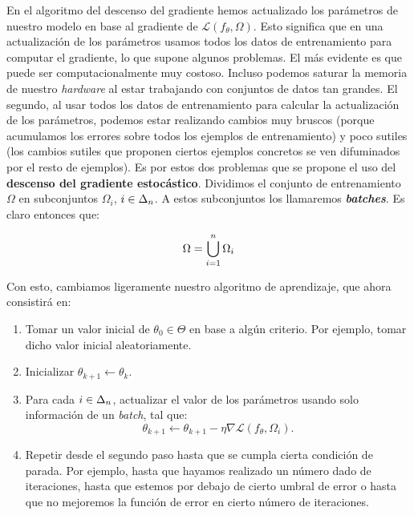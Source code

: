 En el algoritmo del descenso del gradiente hemos actualizado los parámetros de nuestro modelo en base al gradiente de $\mathcal{L}(f_{\theta}, \Omega)$. Esto significa que en una actualización de los parámetros usamos todos los datos de entrenamiento para computar el gradiente, lo que supone algunos problemas. El más evidente es que puede ser computacionalmente muy costoso. Incluso podemos saturar la memoria de nuestro \textit{hardware} al estar trabajando con conjuntos de datos tan grandes. El segundo, al usar todos los datos de entrenamiento para calcular la actualización de los parámetros, podemos estar realizando cambios muy bruscos (porque acumulamos los errores sobre todos los ejemplos de entrenamiento) y poco sutiles (los cambios sutiles que proponen ciertos ejemplos concretos se ven difuminados por el resto de ejemplos). Es por estos dos problemas que se propone el uso del \textbf{descenso del gradiente estocástico}. Dividimos el conjunto de entrenamiento $\Omega$ en subconjuntos $\Omega_i$, $i \in \Delta_{n}$. A estos subconjuntos los llamaremos \textbf{\textit{batches}}. Es claro entonces que:

\begin{equation}
	\Omega = \bigcup_{i = 1}^n \Omega_i
\end{equation}

Con esto, cambiamos ligeramente nuestro algoritmo de aprendizaje, que ahora consistirá en:

\begin{enumerate}
	\item Tomar un valor inicial de $\theta_0 \in \Theta$ en base a algún criterio. Por ejemplo, tomar dicho valor inicial aleatoriamente.
	\item Inicializar $\theta_{k + 1} \leftarrow \theta_k$.
	\item Para cada $i \in \Delta_{n}$, actualizar el valor de los parámetros usando solo información de un \textit{batch}, tal que:
	      \begin{equation}
		      \theta_{k + 1} \leftarrow \theta_{k + 1} - \eta \nabla \mathcal{L}(f_\theta, \Omega_i).
	      \end{equation}
	\item Repetir desde el segundo paso hasta que se cumpla cierta condición de parada. Por ejemplo, hasta que hayamos realizado un número dado de iteraciones, hasta que estemos por debajo de cierto umbral de error o hasta que no mejoremos la función de error en cierto número de iteraciones.
\end{enumerate}


